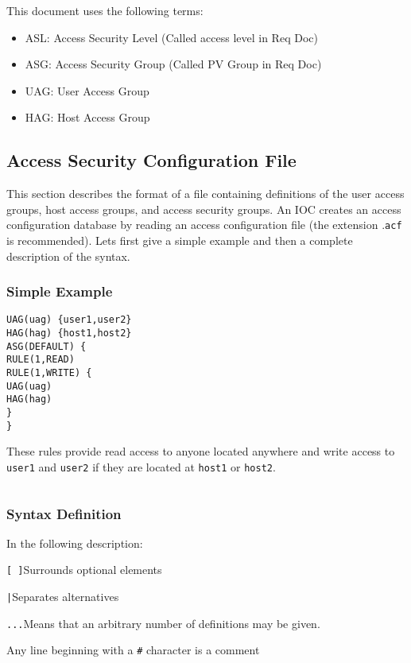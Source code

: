 This document uses the following terms:

\begin{itemize}\item {}ASL:  Access Security Level (Called access level in Req Doc)

\item {}ASG:  Access Security Group (Called PV Group in Req Doc)

\item {}UAG:  User Access Group

\item {}HAG:  Host Access Group

\end{itemize}\subsection{Access Security Configuration File}

This section describes the format of a file containing definitions of the user access groups, host access groups, and access 
security groups. An IOC creates an access configuration database by reading an access configuration file (the extension 
.\verb|acf| is recommended). Lets first give a simple example and then a complete description of the syntax.

\subsubsection{Simple Example}

\begin{verbatim}UAG(uag) {user1,user2}
HAG(hag) {host1,host2}
ASG(DEFAULT) {
RULE(1,READ)
RULE(1,WRITE) {
UAG(uag)
HAG(hag)
}
}
\end{verbatim}These rules provide read access to anyone located anywhere and write access to \verb|user1| and \verb|user2| if they are located at 
\verb|host1| or \verb|host2|.

\begin{verbatim}
\end{verbatim}\subsubsection{Syntax Definition}

In the following description:

\begin{description}\item \verb|[ ]|Surrounds optional elements

\verb||\verb+|+\verb||Separates alternatives

\verb|...|Means that an arbitrary number of definitions may be given.

\end{description}Any line beginning with a \verb|#| character is a comment

